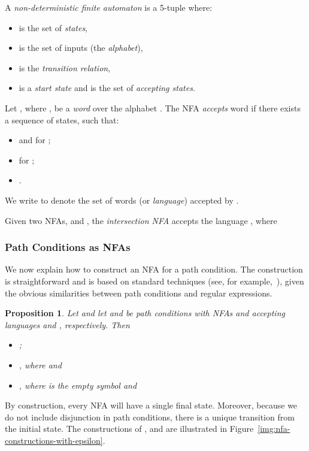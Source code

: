 \documentclass{article}
\newtheorem{proposition}{Proposition}
\begin{document}
A \emph{non-deterministic finite automaton} is a 5-tuple  where:
\begin{itemize}
 \item  is the set of \emph{states},
 \item  is the set of inputs (the \emph{alphabet}),
 \item  is the \emph{transition relation},
 \item  is a \emph{start state} and  is the set of \emph{accepting states}.
\end{itemize}
Let , where , be a \emph{word} over the alphabet .
The NFA  \emph{accepts} word  if there exists a sequence of states,  such that:
\begin{itemize}
 \item  and  for ;
 \item  for ;
 \item .
\end{itemize}
We write  to denote the set of words (or \emph{language}) accepted by .

Given two NFAs, \mbox{} and \mbox{}, the \emph{intersection NFA} \mbox{} accepts the language , where


\subsubsection{Path Conditions as NFAs}

We now explain how to construct an NFA for a path condition.
The construction is straightforward and is based on standard techniques (see, for example,~\cite{Aho_Compilers}), given the obvious similarities between path conditions and regular expressions.

\begin{proposition}
Let  and let  and  be path conditions with NFAs  and  accepting languages  and , respectively. Then \begin{itemize}
 \item \mbox{};
 \item , where  and 
 \item \mbox{}, where  is the empty symbol and 
\end{itemize}
\end{proposition}

By construction, every NFA will have a single final state.
Moreover, because we do not include disjunction in path conditions, there is a unique transition from the initial state.
The constructions of ,  and  are illustrated in Figure~\ref{img:nfa-constructions-with-epsilon}.
\end{document}
